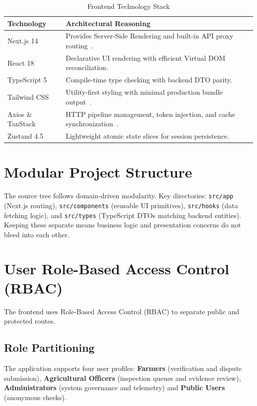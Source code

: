 \begin{table}[htbp]
\centering
\caption{Frontend Technology Stack}
\label{tab:frontend-stack}
\small
\renewcommand{\arraystretch}{1.1}
\begin{tabularx}{\textwidth}{|p{3.8cm}|X|}
\hline
\textbf{Technology} & \textbf{Architectural Reasoning} \\
\hline
Next.js 14 & Provides Server-Side Rendering and built-in API proxy routing~\cite{nextjs2024}. \\
\hline
React 18 & Declarative UI rendering with efficient Virtual DOM reconciliation. \\
\hline
TypeScript 5 & Compile-time type checking with backend DTO parity. \\
\hline
Tailwind CSS & Utility-first styling with minimal production bundle output~\cite{tailwind2024}. \\
\hline
Axios \& TanStack & HTTP pipeline management, token injection, and cache synchronization~\cite{tanstack2024}. \\
\hline
Zustand 4.5 & Lightweight atomic state slices for session persistence. \\
\hline
\end{tabularx}
\end{table}

\newpage
\section{Modular Project Structure}
\label{sec:frontend-project-structure}

The source tree follows domain-driven modularity. Key directories: \texttt{src/app} (Next.js routing), \texttt{src/components} (reusable UI primitives), \texttt{src/hooks} (data fetching logic), and \texttt{src/types} (TypeScript DTOs matching backend entities). Keeping these separate means business logic and presentation concerns do not bleed into each other.

\section{User Role-Based Access Control (RBAC)}
\label{sec:routing-access}

The frontend uses Role-Based Access Control (RBAC) to separate public and protected routes.

\subsection{Role Partitioning}
The application supports four user profiles: \textbf{Farmers} (verification and dispute submission), \textbf{Agricultural Officers} (inspection queues and evidence review), \textbf{Administrators} (system governance and telemetry) and \textbf{Public Users} (anonymous checks).


